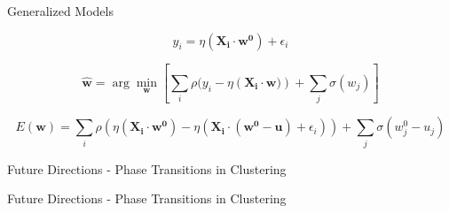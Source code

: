 \documentclass[pdf]{beamer}
\begin{document}
\begin{frame}{Generalized Models}

\begin{equation*}
y_i = \eta(\mathbf{X_i} \cdot \mathbf{w^0}) + \epsilon_i
\end{equation*}


\begin{equation*}
\mathbf{\hat{w}} = \arg \min_{\mathbf{w}}{\left[\sum_i{\rho(y_i - \eta\left(\mathbf{X_i}\cdot \mathbf{w})\right)} + \sum_j{\sigma(w_j)}\right]}
\end{equation*}






\begin{equation*}
E(\mathbf{w}) = \sum_i{\rho \left( \eta\left(\mathbf{X_i} \cdot \mathbf{w^0}\right)- \eta\left(\mathbf{X_i} \cdot (\mathbf{w^0}-\mathbf{u}) + \epsilon_i \right)\right)} + \sum_j{\sigma(w_j^0-u_j)}
\end{equation*}

\end{frame}



\begin{frame}{}




\end{frame}


\begin{frame}{Future Directions - Phase Transitions in Clustering}




\end{frame}



\begin{frame}{Future Directions - Phase Transitions in Clustering}
\end{frame}
\end{document}
